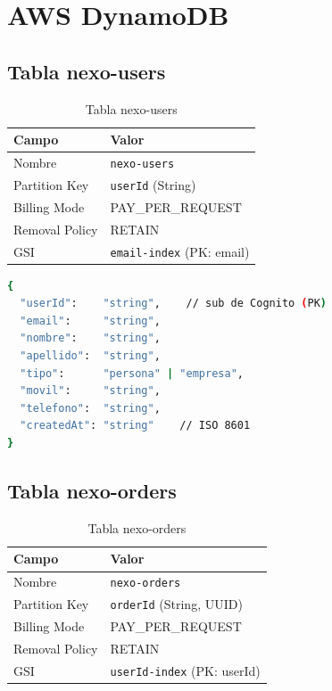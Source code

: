 \documentclass[12pt,a4paper]{article}
\begin{document}
\section{AWS DynamoDB}

\subsection{Tabla nexo-users}

\begin{table}[H]
\centering
\begin{tabular}{@{}ll@{}}
\toprule
\textbf{Campo} & \textbf{Valor} \\
\midrule
Nombre & \texttt{nexo-users} \\
Partition Key & \texttt{userId} (String) \\
Billing Mode & PAY\_PER\_REQUEST \\
Removal Policy & RETAIN \\
GSI & \texttt{email-index} (PK: email) \\
\bottomrule
\end{tabular}
\caption{Tabla nexo-users}
\end{table}

\begin{lstlisting}[language=bash, caption={Esquema de ítem en nexo-users}]
{
  "userId":    "string",    // sub de Cognito (PK)
  "email":     "string",
  "nombre":    "string",
  "apellido":  "string",
  "tipo":      "persona" | "empresa",
  "movil":     "string",
  "telefono":  "string",
  "createdAt": "string"    // ISO 8601
}
\end{lstlisting}

\subsection{Tabla nexo-orders}

\begin{table}[H]
\centering
\begin{tabular}{@{}ll@{}}
\toprule
\textbf{Campo} & \textbf{Valor} \\
\midrule
Nombre & \texttt{nexo-orders} \\
Partition Key & \texttt{orderId} (String, UUID) \\
Billing Mode & PAY\_PER\_REQUEST \\
Removal Policy & RETAIN \\
GSI & \texttt{userId-index} (PK: userId) \\
\bottomrule
\end{tabular}
\caption{Tabla nexo-orders}
\end{table}
\end{document}
